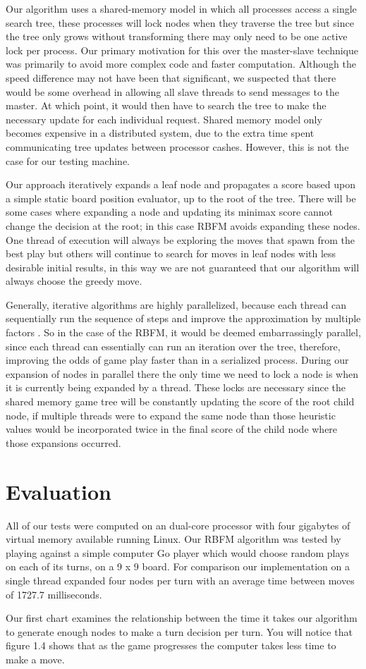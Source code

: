 \documentclass[conference]{IEEEtran}
\begin{document}
Our algorithm uses a shared-memory model in which all processes access a single search tree, these processes will lock nodes when they traverse the tree but since the tree only grows without transforming there may only need to be one active lock per process. Our primary motivation for this over the master-slave technique was primarily to avoid more complex code and faster computation. Although the speed difference may not have been that significant, we suspected that there would be some overhead in allowing all slave threads to send messages to the master. At which point, it would then have to search the tree to make the necessary update for each individual request. Shared memory model only becomes expensive in a distributed system, due to the extra time spent communicating tree updates between processor cashes. However, this is not the case for our testing machine.\par
Our approach iteratively expands a leaf node and propagates a score based upon a simple static board position evaluator, up to the root of the tree. There will be some cases where expanding a node and updating its minimax score cannot change the decision at the root; in this case RBFM avoids expanding these nodes. One thread of execution will always be exploring the moves that spawn from the best play but others will continue to search for moves in leaf nodes with less desirable initial results, in this way we are not guaranteed that our algorithm will always choose the greedy move.\par
Generally, iterative algorithms are highly parallelized, because each thread can sequentially run the sequence of steps and improve the approximation by multiple factors . So in the case of the RBFM, it would be deemed embarrassingly parallel, since each thread can essentially can run an iteration over the tree, therefore, improving the odds of game play faster than in a serialized process. During our expansion of nodes in parallel there the only time we need to lock a node is when it is currently being expanded by a thread. These locks are necessary since the shared memory game tree will be constantly updating the score of the root child node, if multiple threads were to expand the same node than those heuristic values would be incorporated twice in the final score of the child node where those expansions occurred.

\section{Evaluation}
All of our tests were computed on an dual-core processor with four gigabytes of virtual memory available running Linux. Our RBFM algorithm was tested by playing against a simple computer Go player which would choose random plays on each of its turns, on a 9 x 9 board. For comparison our implementation on a single thread expanded four nodes per turn with an average time between moves of 1727.7 milliseconds.\par
Our first chart examines the relationship between the time it takes our algorithm to generate enough nodes to make a turn decision per turn. You will notice that figure 1.4 shows that as the game progresses the computer takes less time to make a move.
\end{document}
